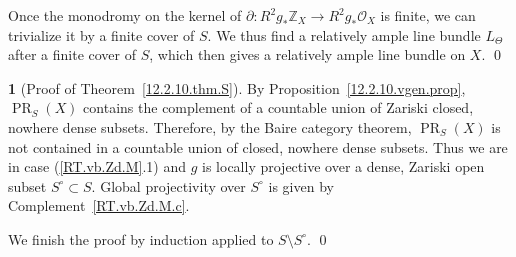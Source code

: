 \documentclass{amsart}
\theoremstyle{definition}
\newtheorem{say}[thm]{}
\theoremstyle{remark}
\renewcommand{\o}[0]{{\mathcal O}}
\newcommand{\z}[0]{{\mathbb Z}}
\begin{document}
 Once the monodromy on  the kernel of $\partial: R^2g_*\z_X\to R^2g_*\o_X$
 is finite, we can  trivialize it by a finite cover of $S$.
 We thus find a relatively ample line bundle $L_\Theta$ after a finite cover of $S$, which then gives a relatively ample line bundle on $X$. \qed

  

 \begin{say}[Proof of Theorem~\ref{12.2.10.thm.S}]\label{12.2.10.thm.S.pf}
   By Proposition~\ref{12.2.10.vgen.prop},  $\operatorname{PR}_{S}(X)$ contains the
   complement of a countable union of Zariski closed, nowhere dense subsets.
   Therefore, by the Baire category theorem,  $\operatorname{PR}_{S}(X)$ is not contained in a  countable union of   closed, nowhere dense subsets. Thus we are in case (\ref{RT.vb.Zd.M}.1) and $g$ is locally projective over a
   dense, Zariski open subset  $S^\circ\subset S$. Global projectivity over $S^\circ$ is given by Complement~\ref{RT.vb.Zd.M.c}.

   We finish the proof by induction applied to $S\setminus S^\circ$. \qed
   \end{say}
\end{document}
